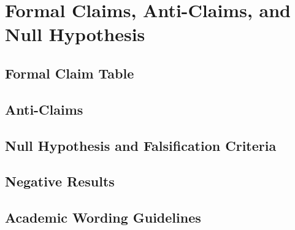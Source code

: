 
\chapter{Formal Claims, Anti-Claims, and Null Hypothesis}
\label{vol3:chap:claims}


\section{Formal Claim Table}
\label{vol3:sec:claims:table}



\section{Anti-Claims}
\label{vol3:sec:claims:anti}



\section{Null Hypothesis and Falsification Criteria}
\label{vol3:sec:claims:null}



\section{Negative Results}
\label{vol3:sec:claims:negative}



\section{Academic Wording Guidelines}
\label{vol3:sec:claims:wording}


